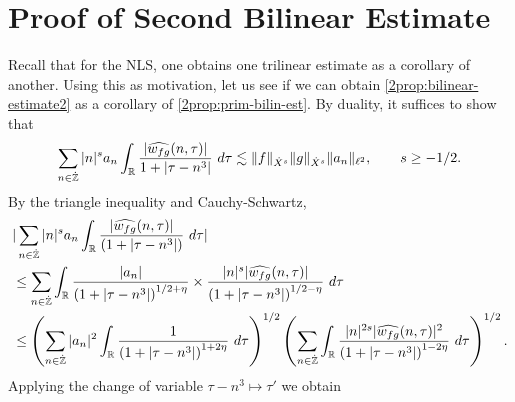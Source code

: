 \section{Proof of Second Bilinear Estimate}
Recall that for the NLS, one obtains one trilinear estimate as a corollary of
another. Using this as motivation, let us see if we can obtain
\cref{2prop:bilinear-estimate2} as a corollary of
\cref{2prop:prim-bilin-est}. By
duality, it suffices to show that
%
\begin{equation}
	\label{2duality-est}
	\begin{split}
		\sum_{n \in \dot{\mathbb{Z}}}  |n|^{s}
		a_n \int_{\mathbb{R}} \frac{|\widehat{w_{fg}}(n, \tau)|}{1 
		+ | \tau - n^3 |} \ d \tau \lesssim \|f\|_{\dot{X}^s} \|g\|_{\dot{X}^s}
		\|a_n \|_{\ell^2}, \qquad s \ge -1/2.
	\end{split}
\end{equation}
%
By the triangle inequality 
and Cauchy-Schwartz,
%
\begin{equation}
	\label{21m}
	\begin{split}
		& | \sum_{n \in \dot{\mathbb{Z}}} |n|^{s} a_n
		\int_{\mathbb{R}}\frac{| \widehat{w_{fg}}(n, \tau) |}{(1 + | \tau - n^3 |)} \ d \tau |
		\\
		& \le \sum_{n \in \dot{\mathbb{Z}}} \int_{\mathbb{R}} \frac{| a_n |}{\left( 1 + 
		| \tau - n^3 |
		\right)^{1/2 + \eta}} \times \frac{| n|^s  |
		\widehat{w_{fg}}(n, \tau) |}{\left( 
		1 + | \tau - n^3 | \right)^{1/2 - \eta}} \ d \tau
		\\
		& \le \left( \sum_{n \in \dot{\mathbb{Z}}} | a_{n} |^2\int_{\mathbb{R}} \frac{1}{\left( 1 + |
		\tau - n^3 | \right)^{1 + 2 \eta}} \ d \tau  
		\right)^{1/2} 
		\left ( \sum_{n \in \dot{\mathbb{Z}}}\int_{\mathbb{R}} \frac{|n|^{2s} | \widehat{w_{fg}}(n, \tau) 
		|^2}{\left( 1 + | \tau - n^3 | \right)^{1 -2 \eta}}\ d \tau 
		\right)^{1/2}.
	\end{split}
\end{equation}
%
Applying the change of variable $\tau - n^3
\mapsto \tau'$ we obtain  

